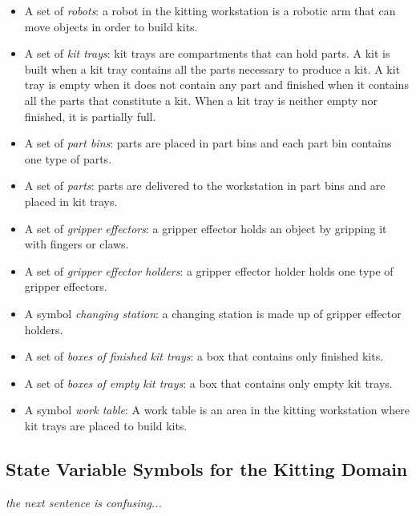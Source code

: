 \begin{small}
\begin{itemize}
\item A set of \emph{robots}: a robot in the kitting workstation is a robotic arm that can move objects in order to build kits.

\item A set of \emph{kit trays}: kit trays are compartments that can hold parts. A kit is built when a kit tray contains all the parts necessary to produce a kit. A kit tray is empty when it does not contain any part and finished when it contains all the parts that constitute a kit. When a kit tray is neither empty nor finished, it is partially full.

\item A set of \emph{part bins}: parts are placed in part bins and each part bin contains one type of parts.

\item A set of \emph{parts}: parts are delivered to the workstation in part bins and are placed in kit trays.

\item A set of \emph{gripper effectors}: a gripper effector holds an object by gripping it with
fingers or claws.

\item A set of \emph{gripper effector holders}: a gripper effector holder holds one type of gripper effectors.

\item A symbol \emph{changing station}: a changing station is made up of gripper effector holders.

\item A set of \emph{boxes of finished kit trays}: a box that contains only finished kits.

\item A set of \emph{boxes of empty kit trays}: a box that contains only empty kit trays.

\item A symbol \emph{work table}: A work table is an area in the kitting workstation where kit trays are placed to build kits.
\end{itemize}
\end {small}
\subsection{State Variable Symbols for the Kitting Domain}
{\it the next sentence is confusing...}


